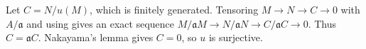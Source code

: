 Let $C=N/u(M)$, which is finitely generated. Tensoring $M\to N\to C\to0$ with $A/\mathfrak{a}$ and using  gives an exact sequence $M/\mathfrak{a}M\to N/\mathfrak{a}N\to C/\mathfrak{a}C\to0$. Thus $C=\mathfrak{a}C$. Nakayama's lemma gives $C=0$, so $u$ is surjective.
